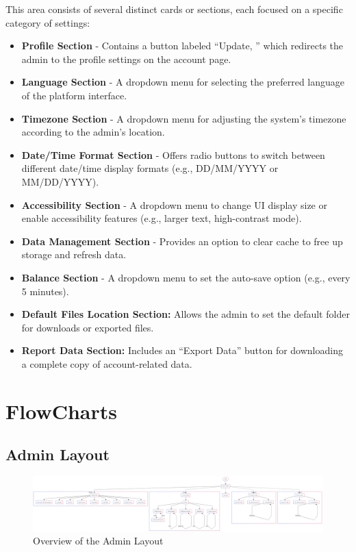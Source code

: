 \documentclass[12pt]{article}
\begin{document}
	This area consists of several distinct cards or sections, each focused on a specific category of settings:
	\begin{itemize}
		\item \textbf{Profile Section} - Contains a button labeled ``Update, '' which redirects the admin to the profile settings on the account page.
		\item \textbf{Language Section} - A dropdown menu for selecting the preferred language of the platform interface.
		\item \textbf{Timezone Section} - A dropdown menu for adjusting the system's timezone according to the admin’s location.
		\item \textbf{Date/Time Format Section} - Offers radio buttons to switch between different date/time display formats (e.g., DD/MM/YYYY or MM/DD/YYYY).
		\item \textbf{Accessibility Section} - A dropdown menu to change UI display size or enable accessibility features (e.g., larger text, high-contrast mode).
		\item \textbf{Data Management Section} - Provides an option to clear cache to free up storage and refresh data.
		\item \textbf{Balance Section} - A dropdown menu to set the auto-save option (e.g., every 5 minutes).
		\item \textbf{Default Files Location Section:} Allows the admin to set the default folder for downloads or exported files.
		\item \textbf{Report Data Section:} Includes an ``Export Data'' button for downloading a complete copy of account-related data.
	\end{itemize}

	\section{FlowCharts}\label{sec:few}

	\subsection{Admin Layout}\label{subsec:admin-layout}

	\begin{figure}[h!]
		\centering
		\includegraphics[width=\linewidth]{pictures/admin/Admin_Layout}
		\caption{Overview of the Admin Layout}
		\label{fig:admin_layout}
	\end{figure}
\end{document}
